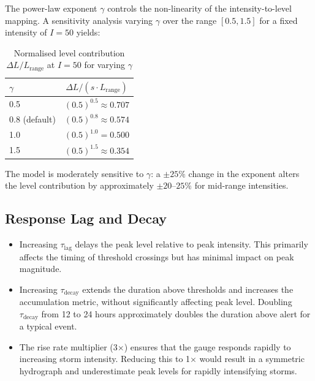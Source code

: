 \documentclass[11pt,a4paper]{article}
\begin{document}
The power-law exponent $\gamma$ controls the non-linearity of the
intensity-to-level mapping. A sensitivity analysis varying $\gamma$ over the
range $[0.5, 1.5]$ for a fixed intensity of $I = 50$ yields:

\begin{table}[H]
    \centering
    \caption{Normalised level contribution $\Delta L / L_{\text{range}}$ at $I = 50$ for varying $\gamma$}
    \label{tab:gamma_sensitivity}
    \begin{tabular}{lc}
        \toprule
        \textbf{$\gamma$} & \textbf{$\Delta L / (s \cdot L_{\text{range}})$} \\
        \midrule
        0.5 & $(0.5)^{0.5} \approx 0.707$ \\
        0.8 (default) & $(0.5)^{0.8} \approx 0.574$ \\
        1.0 & $(0.5)^{1.0} = 0.500$ \\
        1.5 & $(0.5)^{1.5} \approx 0.354$ \\
        \bottomrule
    \end{tabular}
\end{table}

\noindent The model is moderately sensitive to $\gamma$: a $\pm 25\%$ change in
the exponent alters the level contribution by approximately $\pm 20$--$25\%$ for
mid-range intensities.

\subsection{Response Lag and Decay}

\begin{itemize}[nosep]
    \item Increasing $\tau_{\text{lag}}$ delays the peak level relative to peak
          intensity. This primarily affects the timing of threshold crossings
          but has minimal impact on peak magnitude.
    \item Increasing $\tau_{\text{decay}}$ extends the duration above thresholds
          and increases the accumulation metric, without significantly affecting
          peak level. Doubling $\tau_{\text{decay}}$ from 12 to 24 hours
          approximately doubles the duration above alert for a typical event.
    \item The rise rate multiplier (3$\times$) ensures that the gauge responds
          rapidly to increasing storm intensity. Reducing this to 1$\times$ would
          result in a symmetric hydrograph and underestimate peak levels for
          rapidly intensifying storms.
\end{itemize}
\end{document}
